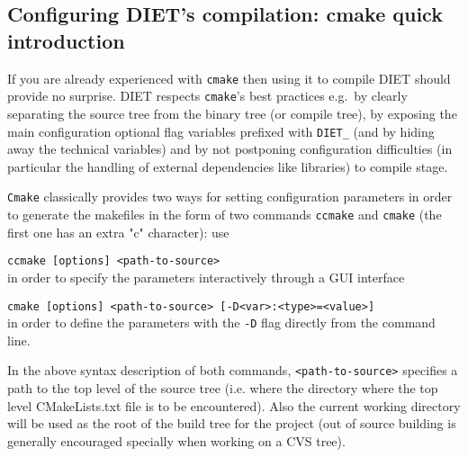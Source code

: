 \subsection{Configuring DIET's compilation: cmake quick introduction}
If you are already experienced with \verb+cmake+ then using it to compile
DIET should provide no surprise. 
DIET respects \verb+cmake+'s best practices e.g.~by clearly separating the
source tree from the binary tree (or compile tree), by exposing the main
configuration optional flag variables prefixed with \verb+DIET_+ (and by
hiding away the technical variables) and by not postponing configuration
difficulties (in particular the handling of external dependencies like
libraries) to compile stage.

\verb+Cmake+ classically provides two ways for setting configuration
parameters in order to generate the makefiles in the form of two
commands \verb+ccmake+ and \verb+cmake+ (the first one has an extra "c"
character): use
\begin{description}
\item{\verb+ccmake [options] <path-to-source>+}\\
  in order to specify the parameters interactively through a GUI interface
\item{\verb+cmake [options] <path-to-source> [-D<var>:<type>=<value>]+}\\
  in order to define the parameters with the \verb+-D+ flag directly
  from the command line.
\end{description}
In the above syntax description of both commands, {\verb+<path-to-source>+}
specifies a path to the top level of the source tree (i.e. where the directory
where the top level CMakeLists.txt file is to be encountered). Also
the current working directory will be used as the root of the build tree for
the project (out of source building is generally encouraged specially
when working on a CVS tree).

